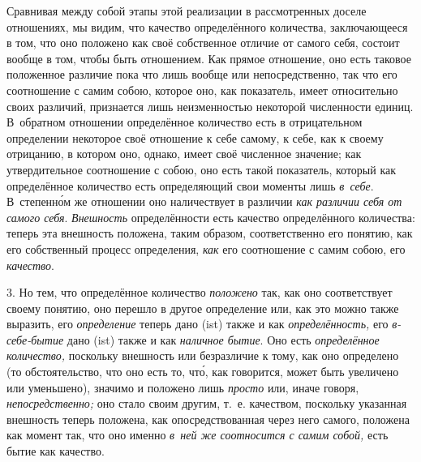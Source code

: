 Сравнивая между собой этапы этой реализации в рассмотренных доселе отношениях,
мы видим, что качество определённого количества, заключающееся в том, что оно
положено как своё собственное отличие от самого себя, состоит вообще в том,
чтобы быть отношением. Как прямое отношение, оно есть таковое положенное
различие пока что лишь вообще или непосредственно, так что его соотношение с
самим собою, которое оно, как показатель, имеет относительно своих различий,
признается лишь неизменностью некоторой численности единиц. В~обратном
отношении определённое количество есть в отрицательном определении некоторое
своё отношение к себе самому, к себе, как к своему отрицанию, в котором оно,
однако, имеет своё численное значение; как утвердительное соотношение с собою,
оно есть такой показатель, который как определённое количество есть
определяющий свои моменты лишь {\em в~себе}. В~степенн\'{о}м же отношении оно
наличествует в различии {\em как различии себя от самого себя}. {\em Внешность}
определённости есть качество определённого количества: теперь эта внешность
положена, таким образом, соответственно его понятию, как его собственный
процесс определения, {\em как} его соотношение с самим собою, его
{\em качество}.

3. Но тем, что определённое количество {\em положено} так, как оно
соответствует своему понятию, оно перешло в другое определение или, как это
можно также выразить, его {\em определение} теперь дано (ist) также и как
{\em определённость,} его {\em в-себе-бытие} дано (ist) также и как
{\em наличное бытие}. Оно есть {\em определённое количество,} поскольку
внешность или безразличие к тому, как оно определено (то обстоятельство, что
оно есть то, чт\'{о}, как говорится, может быть увеличено или уменьшено),
значимо и положено лишь {\em просто} или, иначе говоря, {\em непосредственно;}
оно стало своим другим, т.~е. качеством, поскольку указанная внешность теперь
положена, как опосредствованная через него самого, положена как момент так, что
оно именно {\em в~ней же соотносится с самим собой,} есть бытие как качество.

